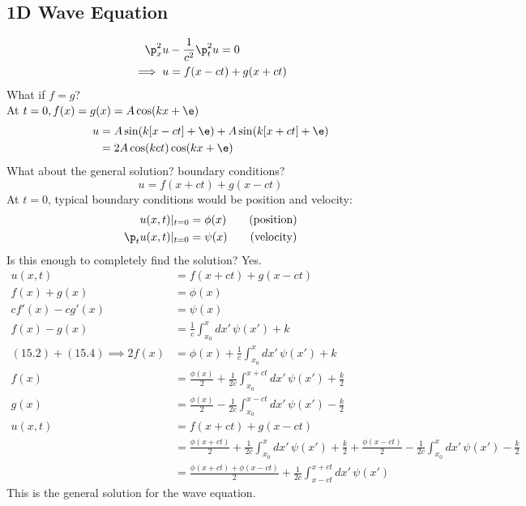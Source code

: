 \documentclass[Maths.tex]{subfiles}
\begin{document}
\section{1D Wave Equation}
\begin{align}
	\p_x^2u &- \frac{1}{c^2}\p_t^2u = 0 \\
	\implies u &= f(x - ct) + g(x + ct)
\end{align}
What if $f = g$? \\
At $t=0, f(x) = g(x) = A\cos(kx + \e)$
\begin{align}
	u &= A\sin(k[x - ct] + \e) + A\sin(k[x + ct] + \e) \\
	  &= 2A\cos(kct)\cos(kx + \e)
\end{align}
What about the general solution? boundary conditions?
\begin{equation}
	u = f(x + ct) + g(x - ct)
\end{equation}
At $t=0$, typical boundary conditions would be position and velocity:
\begin{align}
	u(x,t)|_{t=0} &= \phi(x) \tag{position} \\
	\p_tu(x,t)|_{t=0} &= \psi(x) \tag{velocity}
\end{align}
Is this enough to completely find the solution? Yes.
\begin{align}
	u(x,t) &= f(x+ct) + g(x-ct) \\
	f(x) + g(x) &= \phi(x) \\
	cf'(x) - cg'(x) &= \psi(x) \\
	f(x) - g(x) &= \frac{1}{c}\int_{x_0}^x dx' \,\psi(x') + k \\
	(15.2) + (15.4) \implies 2f(x) &= \phi(x) + \frac{1}{c}\int_{x_0}^x dx'\,\psi(x') + k \\
	f(x) &= \frac{\phi(x)}{2} + \frac{1}{2c}\int_{x_0}^{x+ct} dx'\,\psi(x') + \frac{k}{2} \\
	g(x) &= \frac{\phi(x)}{2} - \frac{1}{2c}\int_{x_0}^{x-ct} dx'\,\psi(x') - \frac{k}{2} \\
	u(x,t) &= f(x+ct) + g(x-ct) \\
		   &= \frac{\phi(x+ct)}{2} + \frac{1}{2c}\int_{x_0}^x dx'\,\psi(x') + \frac{k}{2} + \frac{\phi(x-ct)}{2} - \frac{1}{2c}\int_{x_0}^x dx'\,\psi(x') - \frac{k}{2} \\
		   &= \frac{\phi(x+ct)+\phi(x-ct)}{2} + \frac{1}{2c}\int_{x-ct}^{x+ct} dx'\,\psi(x')
\end{align}
This is the general solution for the wave equation.

\chapter{}
\end{document}
